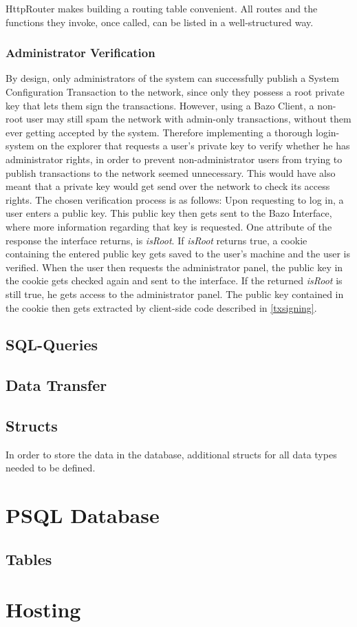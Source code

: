 HttpRouter makes building a routing table convenient. All routes and the functions they invoke, once called, can be listed in a well-structured way.


\subsubsection{Administrator Verification} \label{verification}

By design, only administrators of the system can successfully publish a System Configuration Transaction to the network, since only they possess a root private key that lets them sign the transactions. However, using a Bazo Client, a non-root user may still spam the network with admin-only transactions, without them ever getting accepted by the system. Therefore implementing a thorough login-system on the explorer that requests a user's private key to verify whether he has administrator rights, in order to prevent non-administrator users from trying to publish transactions to the network seemed unnecessary. This would have also meant that a private key would get send over the network to check its access rights. The chosen verification process is as follows:
Upon requesting to log in, a user enters a public key. This public key then gets sent to the Bazo Interface, where more information regarding that key is requested. One attribute of the response the interface returns, is \emph{isRoot}. If \emph{isRoot} returns true, a cookie containing the entered public key gets saved to the user's machine and the user is verified. When the user then requests the administrator panel, the public key in the cookie gets checked again and sent to the interface. If the returned \emph{isRoot} is still true, he gets access to the administrator panel. The public key contained in the cookie then gets extracted by client-side code described in \ref{txsigning}. 

\subsection{SQL-Queries}

\subsection{Data Transfer}

\subsection{Structs}
In order to store the data in the database, additional structs for all data types needed to be defined. 

\section{PSQL Database}

\subsection{Tables}

\section{Hosting}
